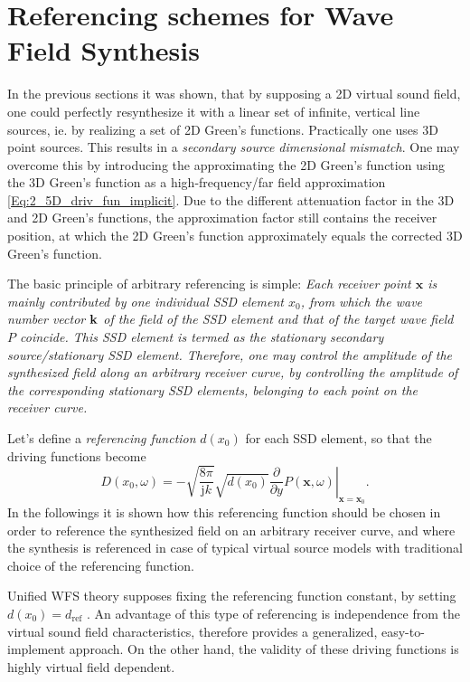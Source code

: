 \documentclass[12pt,a4paper]{article}
\newcommand{\ti}{\mathrm{j}}
\newcommand{\dref}{d_{\mathrm{ref}}}
\newcommand{\vx}{\mathbf{x}}
\newcommand{\vxo}{\mathbf{x}_0}
\begin{document}
\section{Referencing schemes for Wave Field Synthesis}

In the previous sections it was shown, that by supposing a 2D virtual sound field, one could perfectly resynthesize it with a linear set of infinite, vertical line sources, ie. by realizing a set of 2D Green's functions. Practically one uses 3D point sources. This results in a \emph{secondary source dimensional mismatch}. One may overcome this by introducing the approximating the 2D Green's function using the 3D Green's function as a high-frequency/far field approximation \eqref{Eq:2_5D_driv_fun_implicit}.
Due to the different attenuation factor in the 3D and 2D Green's functions, the approximation factor still contains the receiver position, at which the 2D Green's function approximately equals the corrected 3D Green's function. 

The basic principle of arbitrary referencing is simple:
\emph{Each receiver point $\vx$ is mainly contributed by one individual SSD element $x_0$, from which the wave number vector ${\bf k}$ of the field of the SSD element and that of the target wave field $P$ coincide. This SSD element is termed as the stationary secondary source/stationary SSD element.
Therefore, one may control the amplitude of the synthesized field along an arbitrary receiver curve, by controlling the amplitude of the corresponding stationary SSD elements, belonging to each point on the receiver curve.}
 
\vspace{3mm}
Let's define a \emph{referencing function} $d(x_0)$ for each SSD element, so that the driving functions become
\begin{equation}
D(x_0,\omega) = 
- \sqrt{\frac{8\pi}{\ti k}} \sqrt{d(x_0)} \left. \frac{\partial}{\partial y} P(\vx,\omega) \right|_{\vx = \vxo}.
\label{Eq:Gen_rayleigh_dx0}
\end{equation}
In the followings it is shown how this referencing function should be chosen in order to reference the synthesized field on an arbitrary receiver curve, and where the synthesis is referenced in case of typical virtual source models with traditional choice of the referencing function.

Unified WFS theory supposes fixing the referencing function constant, by setting $d(x_0) = \dref$ \cite{Ahrens2012}.
An advantage of this type of referencing is independence from the virtual sound field characteristics, therefore provides a generalized, easy-to-implement approach. On the other hand, the validity of these driving functions is highly virtual field dependent.
\end{document}

